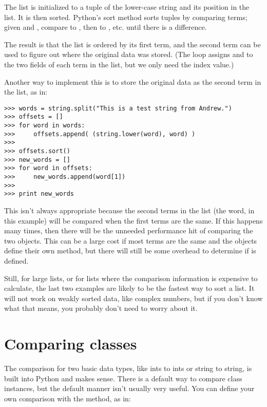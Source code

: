 \documentclass{howto}
\begin{document}
The  list is initialized to a tuple of the lower-case string
and its position in the  list.  It is then sorted.  Python's
sort method sorts tuples by comparing terms; given  and , compare
 to , then  to , etc. until there is a difference.

The result is that the  list is ordered by its first
term, and the second term can be used to figure out where the original
data was stored.  (The  loop assigns  and
 to the two fields of each term in the list, but we only need the
index value.)

Another way to implement this is to store the original data as the
second term in the  list, as in:

\begin{verbatim}
>>> words = string.split("This is a test string from Andrew.")
>>> offsets = []
>>> for word in words:
>>>     offsets.append( (string.lower(word), word) )
>>> 
>>> offsets.sort()
>>> new_words = []
>>> for word in offsets:
>>>     new_words.append(word[1])
>>> 
>>> print new_words
\end{verbatim}

This isn't always appropriate because the second terms in the list
(the word, in this example) will be compared when the first terms are
the same.  If this happens many times, then there will be the unneeded
performance hit of comparing the two objects.  This can be a large
cost if most terms are the same and the objects define their own
 method, but there will still be some overhead to determine if
 is defined.

Still, for large lists, or for lists where the comparison information
is expensive to calculate, the last two examples are likely to be the
fastest way to sort a list.  It will not work on weakly sorted data,
like complex numbers, but if you don't know what that means, you
probably don't need to worry about it.

\section{Comparing classes}

The comparison for two basic data types, like ints to ints or string to
string, is built into Python and makes sense.  There is a default way
to compare class instances, but the default manner isn't usually very
useful.  You can define your own comparison with the  method,
as in:
\end{document}

